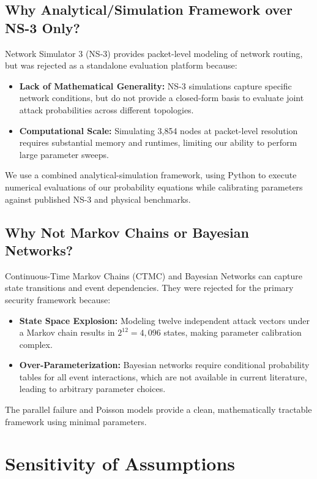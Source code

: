 \documentclass[12pt, oneside, a4paper]{report}
\theoremstyle{definition}
\theoremstyle{remark}
\begin{document}
\subsection{Why Analytical/Simulation Framework over NS-3 Only?}
Network Simulator 3 (NS-3) provides packet-level modeling of network routing, but was rejected as a standalone evaluation platform because:
\begin{itemize}
  \item \textbf{Lack of Mathematical Generality:} NS-3 simulations capture specific network conditions, but do not provide a closed-form basis to evaluate joint attack probabilities across different topologies.
  \item \textbf{Computational Scale:} Simulating 3,854 nodes at packet-level resolution requires substantial memory and runtimes, limiting our ability to perform large parameter sweeps.
\end{itemize}
We use a combined analytical-simulation framework, using Python to execute numerical evaluations of our probability equations while calibrating parameters against published NS-3 and physical benchmarks.

\subsection{Why Not Markov Chains or Bayesian Networks?}
Continuous-Time Markov Chains (CTMC) and Bayesian Networks can capture state transitions and event dependencies. They were rejected for the primary security framework because:
\begin{itemize}
  \item \textbf{State Space Explosion:} Modeling twelve independent attack vectors under a Markov chain results in $2^{12} = 4{,}096$ states, making parameter calibration complex.
  \item \textbf{Over-Parameterization:} Bayesian networks require conditional probability tables for all event interactions, which are not available in current literature, leading to arbitrary parameter choices.
\end{itemize}
The parallel failure and Poisson models provide a clean, mathematically tractable framework using minimal parameters.

\section{Sensitivity of Assumptions}
\label{sec:dd:sensitivity}
\end{document}
